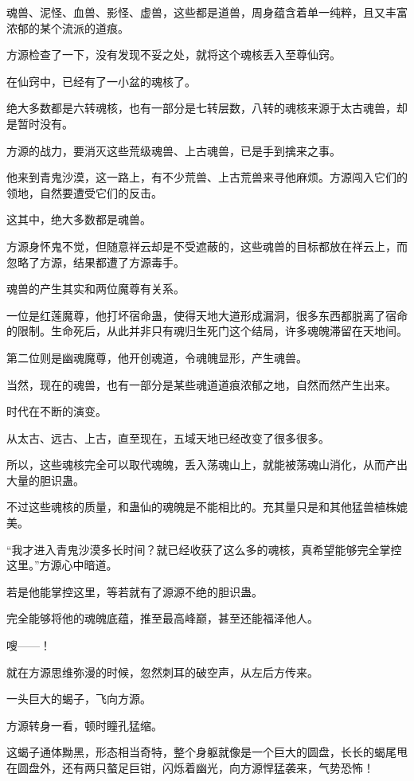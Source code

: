 \begin{this_body}
魂兽、泥怪、血兽、影怪、虚兽，这些都是道兽，周身蕴含着单一纯粹，且又丰富浓郁的某个流派的道痕。

方源检查了一下，没有发现不妥之处，就将这个魂核丢入至尊仙窍。

在仙窍中，已经有了一小盆的魂核了。

绝大多数都是六转魂核，也有一部分是七转层数，八转的魂核来源于太古魂兽，却是暂时没有。

方源的战力，要消灭这些荒级魂兽、上古魂兽，已是手到擒来之事。

他来到青鬼沙漠，这一路上，有不少荒兽、上古荒兽来寻他麻烦。方源闯入它们的领地，自然要遭受它们的反击。

这其中，绝大多数都是魂兽。

方源身怀鬼不觉，但随意祥云却是不受遮蔽的，这些魂兽的目标都放在祥云上，而忽略了方源，结果都遭了方源毒手。

魂兽的产生其实和两位魔尊有关系。

一位是红莲魔尊，他打坏宿命蛊，使得天地大道形成漏洞，很多东西都脱离了宿命的限制。生命死后，从此并非只有魂归生死门这个结局，许多魂魄滞留在天地间。

第二位则是幽魂魔尊，他开创魂道，令魂魄显形，产生魂兽。

当然，现在的魂兽，也有一部分是某些魂道道痕浓郁之地，自然而然产生出来。

时代在不断的演变。

从太古、远古、上古，直至现在，五域天地已经改变了很多很多。

所以，这些魂核完全可以取代魂魄，丢入荡魂山上，就能被荡魂山消化，从而产出大量的胆识蛊。

不过这些魂核的质量，和蛊仙的魂魄是不能相比的。充其量只是和其他猛兽植株媲美。

“我才进入青鬼沙漠多长时间？就已经收获了这么多的魂核，真希望能够完全掌控这里。”方源心中暗道。

若是他能掌控这里，等若就有了源源不绝的胆识蛊。

完全能够将他的魂魄底蕴，推至最高峰巅，甚至还能福泽他人。

嗖——！

就在方源思维弥漫的时候，忽然刺耳的破空声，从左后方传来。

一头巨大的蝎子，飞向方源。

方源转身一看，顿时瞳孔猛缩。

这蝎子通体黝黑，形态相当奇特，整个身躯就像是一个巨大的圆盘，长长的蝎尾甩在圆盘外，还有两只螯足巨钳，闪烁着幽光，向方源悍猛袭来，气势恐怖！


\end{this_body}
